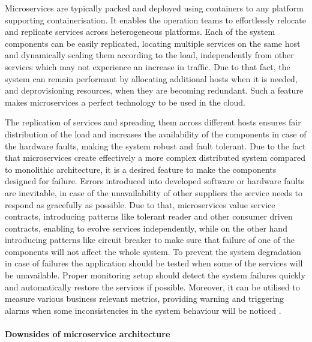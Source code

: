 Microservices are typically packed and deployed using containers to any platform supporting containerisation. It enables the operation teams to effortlessly relocate and replicate services across heterogeneous platforms. Each of the system components can be easily replicated, locating multiple services on the same host and dynamically scaling them according to the load, independently from other services which may not experience an increase in traffic. Due to that fact, the system can remain performant by allocating additional hosts when it is needed, and deprovisioning resources, when they are becoming redundant. Such a feature makes microservices a perfect technology to be used in the cloud.

The replication of services and spreading them across different hosts ensures fair distribution of the load and increases the availability of the components in case of the hardware faults, making the system robust and fault tolerant. Due to the fact that microservices create effectively a more complex distributed system compared to monolithic architecture, it is a desired feature to make the components designed for failure. Errors introduced into developed software or hardware faults are inevitable, in case of the unavailability of other suppliers the service needs to respond as gracefully as possible. Due to that, microservices value service contracts, introducing patterns like tolerant reader and other consumer driven contracts, enabling to evolve services independently, while on the other hand introducing patterns like circuit breaker to make sure that failure of one of the components will not affect the whole system. To prevent the system degradation in case of failures the application should be tested when some of the services will be unavailable. Proper monitoring setup should detect the system failures quickly and automatically restore the services if possible. Moreover, it can be utilised to measure various business relevant metrics, providing warning and triggering alarms when some inconsistencies in the system behaviour will be noticed \cite{MicroservicesHowToMakeYourApplicationScale}.

\paragraph{Downsides of microservice architecture}

